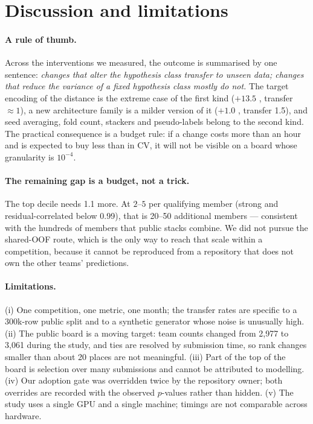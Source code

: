 \section{Discussion and limitations}

\paragraph{A rule of thumb.} Across the interventions we measured, the outcome is summarised by
one sentence: \emph{changes that alter the hypothesis class transfer to unseen data; changes that
reduce the variance of a fixed hypothesis class mostly do not.} The target encoding of the
distance is the extreme case of the first kind ($+13.5$ \dlt{}, transfer $\approx1$), a new
architecture family is a milder version of it ($+1.0$ \dlt{}, transfer 1.5), and seed
averaging, fold count, stackers and pseudo-labels belong to the second kind. The practical
consequence is a budget rule: if a change costs more than an hour and is expected to buy less
than  in CV, it will not be visible on a board whose granularity is $10^{-4}$.

\paragraph{The remaining gap is a budget, not a trick.} The top decile needs 1.1 \dlt{} more.
At $2$--$5$ \dlt{} per qualifying member (strong and residual-correlated below 0.99), that is
20--50 additional members --- consistent with the hundreds of members that public stacks
combine. We did not pursue the shared-OOF route, which is the only way to reach that scale
within a competition, because it cannot be reproduced from a repository that does not own the
other teams' predictions.

\paragraph{Limitations.} (i) One competition, one metric, one month; the transfer rates are
specific to a 300k-row public split and to a synthetic generator whose noise is unusually high.
(ii) The public board is a moving target: team counts changed from 2{,}977 to 3{,}061 during the
study, and ties are resolved by submission time, so rank changes smaller than about 20 places
are not meaningful. (iii) Part of the top of the board is selection over many submissions and
cannot be attributed to modelling. (iv) Our adoption gate was overridden twice by the
repository owner; both overrides are recorded with the observed $p$-values rather than hidden.
(v) The study uses a single GPU and a single machine; timings are not comparable across
hardware.

